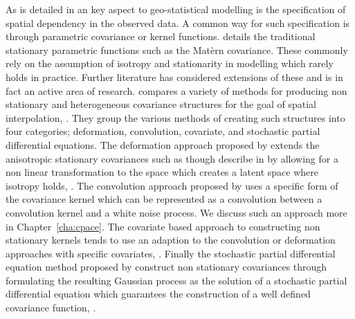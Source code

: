 As is detailed in \cite{cressie_statistics_2010} an key aspect to geo-statistical modelling is the specification of spatial dependency in the observed data.
A common way for such specification is through parametric covariance or kernel functions.
\cite{cressie_statistics_2010} details the traditional stationary parametric functions such as the Mat\`{e}rn covariance.
These commonly rely on the assumption of isotropy and stationarity in modelling which rarely holds in practice.
Further literature has considered extensions of these and is in fact an active area of research.
\citeauthor{schmidt_flexible_2020} compares a variety of methods for producing non stationary and heterogeneous covariance structures for the goal of spatial interpolation, \citep{schmidt_flexible_2020}.
They group the various methods of creating such structures into four categories; deformation, convolution, covariate, and stochastic partial differential equations.
The deformation approach proposed by \citeauthor{sampson_nonparametric_1992} extends the anisotropic stationary covariances such as though describe in \cite{cressie_statistics_2010} by allowing for a non linear transformation to the space which creates a latent space where isotropy holds, \cite{sampson_nonparametric_1992}.
The convolution approach proposed by \citeauthor{higdon_space_2002} uses a specific form of the covariance kernel which can be represented as a convolution between a convolution kernel and a white noise process.
We discuss such an approach more in Chapter~\ref{cha:cpace}.
The covariate based approach to constructing non stationary kernels tends to use an adaption to the convolution or deformation approaches with specific covariates, \citep{schmidt_flexible_2020}.
Finally the stochastic partial differential equation method proposed by \citeauthor{lindgren_explicit_2011} construct non stationary covariances through formulating the resulting Gaussian process as the solution of a stochastic partial differential equation which guarantees the construction of a well defined covariance function, \citep{lindgren_explicit_2011}. 

